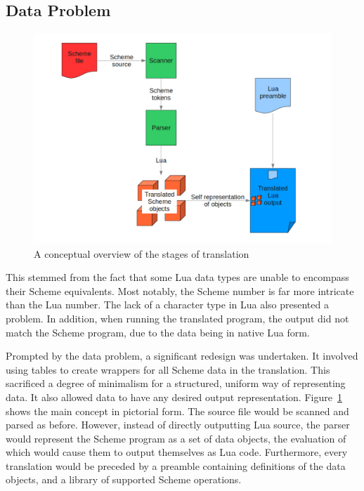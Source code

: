 \subsection{Data Problem}

\begin{figure}
\centering
\includegraphics[width=\textwidth]{overview.png}
\caption{A conceptual overview of the stages of translation}
\label{fig:overview}
\end{figure}

This stemmed from the fact that some Lua data types are unable to encompass
their Scheme equivalents. Most notably, the Scheme number is far more intricate
than the Lua number. The lack of a character type in Lua also presented a
problem. In addition, when running the translated program, the output did not
match the Scheme program, due to the data being in native Lua form.

Prompted by the data problem, a significant redesign was undertaken. It involved
using tables to create wrappers for all Scheme data in the translation. This
sacrificed a degree of minimalism for a structured, uniform way of representing
data. It also allowed data to have any desired output representation.
Figure~\ref{fig:overview} shows the main concept in pictorial form. The source
file would be scanned and parsed as before. However, instead of directly
outputting Lua source, the parser would represent the Scheme program as a set of
data objects, the evaluation of which would cause them to output themselves as
Lua code. Furthermore, every translation would be preceded by a preamble
containing definitions of the data objects, and a library of supported Scheme
operations.

